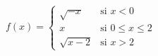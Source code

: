 \item $f(x) = \begin{cases} \sqrt{-x} & \text{si } x < 0 \\ x & \text{si } 0 \le x \le 2 \\ \sqrt{x - 2} & \text{si } x > 2 \end{cases}$
